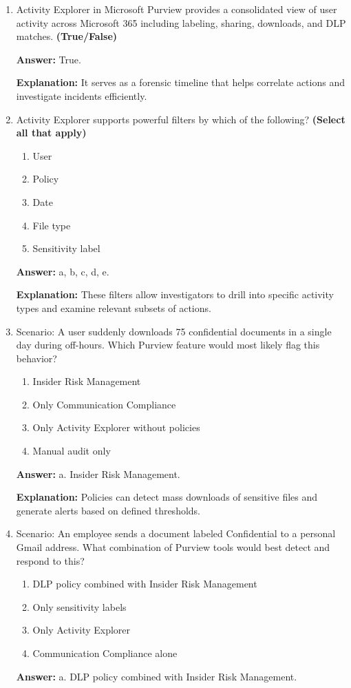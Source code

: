 \documentclass[10pt]{article}
\begin{document}
\begin{enumerate}[leftmargin=*]
\item Activity Explorer in Microsoft Purview provides a consolidated view of user activity across Microsoft 365 including labeling, sharing, downloads, and DLP matches. \textbf{(True/False)}

\textbf{Answer:} True.

\textbf{Explanation:} It serves as a forensic timeline that helps correlate actions and investigate incidents efficiently.

\item Activity Explorer supports powerful filters by which of the following? \textbf{(Select all that apply)}
\begin{enumerate}[label=\alph*., leftmargin=1.5em]
\item User
\item Policy
\item Date
\item File type
\item Sensitivity label
\end{enumerate}
\textbf{Answer:} a, b, c, d, e.

\textbf{Explanation:} These filters allow investigators to drill into specific activity types and examine relevant subsets of actions.

\item Scenario: A user suddenly downloads 75 confidential documents in a single day during off-hours. Which Purview feature would most likely flag this behavior?
\begin{enumerate}[label=\alph*., leftmargin=1.5em]
\item Insider Risk Management
\item Only Communication Compliance
\item Only Activity Explorer without policies
\item Manual audit only
\end{enumerate}
\textbf{Answer:} a. Insider Risk Management.

\textbf{Explanation:} Policies can detect mass downloads of sensitive files and generate alerts based on defined thresholds.

\item Scenario: An employee sends a document labeled Confidential to a personal Gmail address. What combination of Purview tools would best detect and respond to this?
\begin{enumerate}[label=\alph*., leftmargin=1.5em]
\item DLP policy combined with Insider Risk Management
\item Only sensitivity labels
\item Only Activity Explorer
\item Communication Compliance alone
\end{enumerate}
\textbf{Answer:} a. DLP policy combined with Insider Risk Management.


\end{enumerate}
\end{document}
